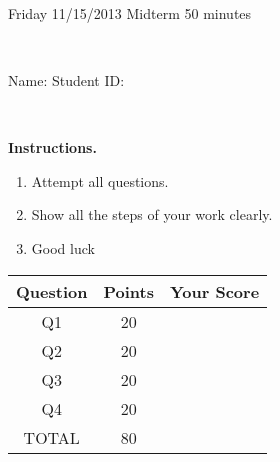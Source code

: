 \documentclass[12pt, oneside]{amsart}
\newcommand{\one}{20}
\newcommand{\two}{20}
\newcommand{\three}{20}
\newcommand{\four}{20}
\begin{document}
%

\begin{center}
    \hrulefill\\
    {\bf \textsf{\raisebox{-0.10cm}{Fall 2013: MATH 163} \hspace{\fill} 
            \raisebox{-0.10cm}{Ordinary Differential Equations} \hspace{\fill}
            \raisebox{-0.10cm}{David Karapetyan}}}\\
    \hrulefill\\
    {\large \rule{0cm}{1.2cm} \textsf{Friday 11/15/2013} \hfill
        \textsf{Midterm} \hfill  \textsf{50 minutes}}\\
    {\large\rule{0cm}{1.2cm}\textsf{Name: \framebox[2.9in]{\rule{0cm}{0.8cm}} 
            \hspace{\fill}
            Student ID: \framebox[2.1in]{\rule{0cm}{0.8cm}}}}\\
\end{center}
\vspace{0.8cm}

\noindent
{\bf \textsf{Instructions.}}

\begin{enumerate}
    \item Attempt all questions.   
    \item Show all the steps of your work clearly.  
    \item Good luck 
\end{enumerate}

\vfill


\begin{center}
    {\large
        \begin{tabular}{|c|c|c|}
            \hline
            \rule[-0.3cm]{0cm}{1cm}
            \textsf{Question} & \textsf{Points} &  \textsf{Your Score} \\
            \hline
            \hline
            \rule[-0.3cm]{0cm}{1cm}
            \textsf{Q1} & \one &\\
            \hline
            \rule[-0.3cm]{0cm}{1cm}
            \textsf{Q2} & \two &\\
            \hline
            \rule[-0.3cm]{0cm}{1cm}
            \textsf{Q3} & \three &\\
            \hline
            \rule[-0.3cm]{0cm}{1cm}
            \textsf{Q4} & \four &\\
            \hline
            \rule[-0.3cm]{0cm}{1cm}

            \textsf{TOTAL} & 80 & \\
            \hline
        \end{tabular}
    } 

\end{center}
\end{document}
